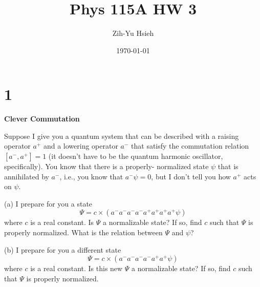 \documentclass{article}
\title{Phys 115A HW 3}
\author{Zih-Yu Hsieh}
\date{\today}
\begin{document}
\maketitle

\section*{1}
\begin{ques}\label{q1}
\textbf{Clever Commutation}

Suppose I give you a quantum system that can be described with a raising operator $a^+$ and
a lowering operator $a^-$ that satisfy the commutation relation $[a^-, a^+] = 1$ (it doesn’t have
to be the quantum harmonic oscillator, specifically). You know that there is a properly-
normalized state $\psi$ that is annihilated by $a^-$, i.e., you know that $a^- \psi = 0$, but I don’t tell
you how $a^+$ acts on $\psi$.

(a) I prepare for you a state
\[
\Psi = c\times (a^-a^-a^-a^-a^+a^+a^+a^+\psi)
\]
where $c$ is a real constant. Is $\Psi$ a normalizable state? If so, find $c$ such that $\Psi$ is
properly normalized. What is the relation between $\Psi$ and $\psi$?

(b) I prepare for you a different state
\[
\Psi = c\times (a^-a^-a^-a^-a^+a^+ \psi)
\]
where $c$ is a real constant. Is this new $\Psi$ a normalizable state? If so, find $c$ such that
$\Psi$ is properly normalized.
\end{ques}
\end{document}
